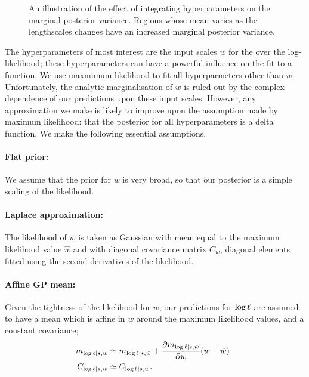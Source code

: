 \documentclass{article}
\begin{document}
\begin{figure}
\centering
{}
\caption{An illustration of the effect of integrating hyperparameters on the marginal posterior variance.  Regions whose mean varies as the lengthscales changes have an increased marginal posterior variance.}
\label{fig:integrate_hypers}
\end{figure}

The hyperparameters of most interest are the input scales $w$ for the \gpb over the log-likelihood; these hyperparameters can have a powerful influence on the fit to a function. We use maxmimum likelihood to fit all hyperparmeters other than $w$. Unfortunately, the analytic marginalisation of $w$ is ruled out by the complex dependence of our predictions upon these input scales. However, any approximation we make is likely to improve upon the assumption made by maximum likelihood: that the posterior for all hyperparameters is a delta function. We make the following essential assumptions.

 \paragraph*{Flat prior:} We assume that the prior for $w$ is very broad, so that our posterior is a simple scaling of the likelihood. 
\paragraph*{Laplace approximation:} The likelihood of $w$ is taken as Gaussian with mean equal to the maximum likelihood value $\hat{w}$ and with diagonal covariance matrix $C_w$, diagonal elements fitted using the second derivatives of the likelihood.
\paragraph*{Affine GP mean:} Given the tightness of the likelihood for $w$, our predictions for $\tr$ are assumed to have a \gpb mean which is affine in $w$ around the maximum likelihood values, and a constant covariance;
\begin{align}
\hspace{-0.2cm} m_{\tr|s,w} & \simeq m_{\tr|s,\hat{w}} 
 + \pderiv{m_{\tr|s,\hat{w}}}{w} (w- \hat{w})\\
 \hspace{-0.2cm} C_{\tr|s, w} & \simeq C_{\tr|s, \hat{w}}.
\end{align}
 
\end{document}
